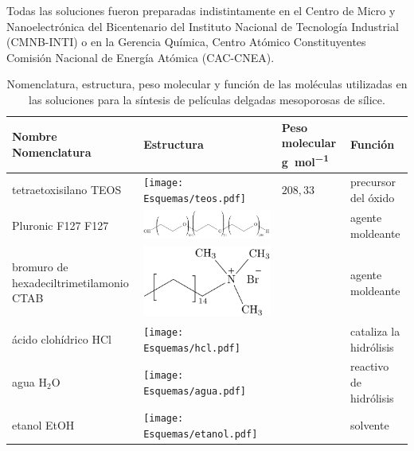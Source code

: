 		Todas las soluciones fueron preparadas indistintamente en el Centro de Micro y Nanoelectrónica del Bicentenario del Instituto Nacional de Tecnología Industrial (CMNB-INTI) o en la Gerencia Química, Centro Atómico Constituyentes Comisión Nacional de Energía Atómica (CAC-CNEA). 
				\begin{table}[ht] 
						  \caption[Reactivos para los soles]{Nomenclatura, estructura, peso molecular y función de las moléculas utilizadas en las soluciones para la síntesis de películas delgadas mesoporosas de sílice.} 
				  		  \begin{tabular}{>{\raggedright\arraybackslash}m{2.40cm}>{\centering\arraybackslash}m{4cm}>{\centering\arraybackslash}m{2.35cm}>{\raggedright\arraybackslash}m{1.7cm}} 
				  		  \toprule
						  Nombre Nomenclatura    & Estructura & Peso molecular \si{g.mol^{-1}} & Función\\ \midrule
				      	  tetraetoxisilano\index{tetraetoxisilano} TEOS & \texttt{[image: Esquemas/teos.pdf]} & $208,33$ & precursor\index{precursor} del óxido  \\ \midrule
				  		  Pluronic F127\index{Pluronic F127} F127    & \hspace*{-10px} \includegraphics[scale=0.5]{Esquemas/f127.pdf} & \multirow{1}{*}{$13800$}	 & agente moldeante\index{agente moldeante}	 \\ \midrule
				  		  bromuro de hexadeciltrimetilamonio\index{bromuro de hexadeciltrimetilamonio}  CTAB   & \hspace*{1cm} \includegraphics[scale=0.6]{Esquemas/ctab.pdf} & \multirow{1}{*}{$364.48$}	 & agente moldeante\index{agente moldeante}	 \\ \midrule
				  		  ácido\index{acido@ácido} clohídrico\index{acido@ácido!clohídrico} HCl\index{acido@ácido!clohídrico}& \texttt{[image: Esquemas/hcl.pdf]}  & \multirow{1}{*}{$36,46$}   & cataliza la hidrólisis\index{hidrólisis} \\ \midrule
				  		  agua \hspace{2cm} H$_2$O  &  \texttt{[image: Esquemas/agua.pdf]}  & \multirow{1}{*}{$18,02$}   & reactivo de hidrólisis\index{hidrólisis} \\ \midrule
				  		  etanol\index{etanol} \hspace{2cm} EtOH\index{etanol}  & \texttt{[image: Esquemas/etanol.pdf]}  & \multirow{1}{*}{$46,07$}   & solvente \\ 
				  		  \bottomrule
				    	  \end{tabular}
				   		  \label{tabla:reactivos}
				 \end{table}
		
